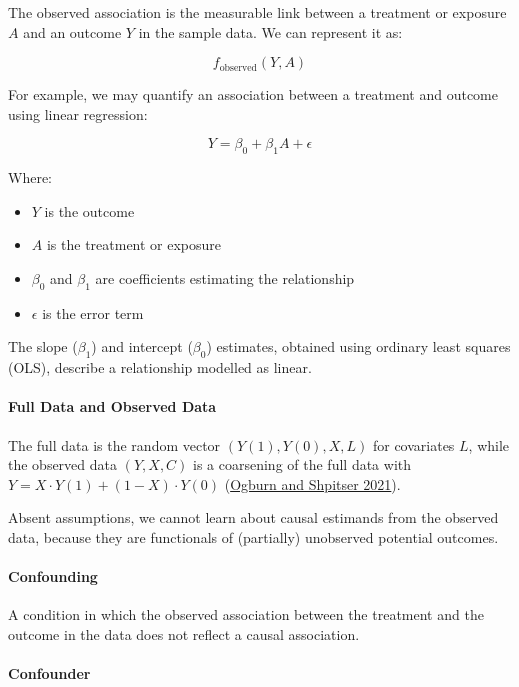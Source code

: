 \documentclass[
  singlecolumn]{article}
\let\oldparagraph\paragraph
\renewcommand{\paragraph}[1]{\oldparagraph{#1}\mbox{}}
\providecommand{\tightlist}{%
  \setlength{\itemsep}{0pt}\setlength{\parskip}{0pt}}\usepackage{longtable,booktabs,array}
\begin{document}
The observed association is the measurable link between a treatment or
exposure \(A\) and an outcome \(Y\) in the sample data. We can represent
it as:

\[f_{\text{observed}}(Y, A)\]

For example, we may quantify an association between a treatment and
outcome using linear regression:

\[Y = \beta_0 + \beta_1 A + \epsilon\]

Where:

\begin{itemize}
\tightlist
\item
  \(Y\) is the outcome
\item
  \(A\) is the treatment or exposure
\item
  \(\beta_0\) and \(\beta_1\) are coefficients estimating the
  relationship
\item
  \(\epsilon\) is the error term
\end{itemize}

The slope (\(\beta_1\)) and intercept (\(\beta_0\)) estimates, obtained
using ordinary least squares (OLS), describe a relationship modelled as
linear.

\paragraph{\texorpdfstring{\textbf{Full Data and Observed
Data}}{Full Data and Observed Data}}\label{full-data-and-observed-data}

The full data is the random vector \((Y(1), Y(0), X, L)\) for covariates
\(L\), while the observed data \((Y, X, C)\) is a coarsening of the full
data with \(Y = X \cdot Y(1) + (1-X) \cdot Y(0)\)
(\hyperref[ref-ogburn2021]{Ogburn and Shpitser 2021}).

Absent assumptions, we cannot learn about causal estimands from the
observed data, because they are functionals of (partially) unobserved
potential outcomes.

\paragraph{\texorpdfstring{\textbf{Confounding}}{Confounding}}\label{confounding}

A condition in which the observed association between the treatment and
the outcome in the data does not reflect a causal association.

\paragraph{\texorpdfstring{\textbf{Confounder}}{Confounder}}\label{confounder}
\end{document}
